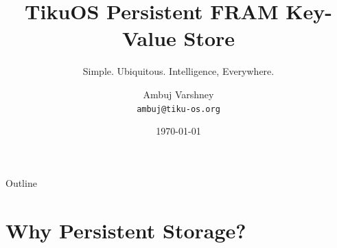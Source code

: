 \documentclass[aspectratio=169, 10pt]{beamer}
\title[TikuOS Persistent Store]{TikuOS Persistent FRAM Key-Value Store}
\subtitle{Simple. Ubiquitous. Intelligence, Everywhere.}
\author[Ambuj Varshney]{Ambuj Varshney \\ \texttt{ambuj@tiku-os.org}}
\date{\today}
\begin{document}
\begin{frame}
\titlepage
\end{frame}

\begin{frame}{Outline}
\tableofcontents
\end{frame}

\section{Why Persistent Storage?}
\end{document}
